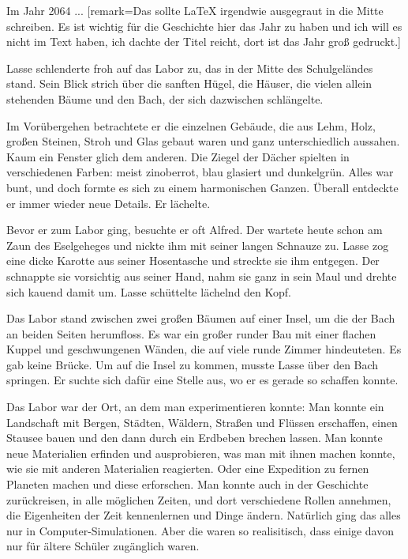 \label{cha:2064_das_labor}

Im Jahr 2064 ... [remark={Das sollte LaTeX irgendwie ausgegraut in die Mitte schreiben. Es ist wichtig für die Geschichte hier das Jahr zu haben und ich will es nicht im Text haben, ich dachte der Titel reicht, dort ist das Jahr groß gedruckt.}]

Lasse schlenderte froh auf das Labor zu, das in der Mitte des Schulgeländes stand. 
Sein Blick strich über die sanften Hügel, die Häuser, die vielen allein stehenden Bäume und den Bach, der sich dazwischen schlängelte.

Im Vorübergehen betrachtete er die einzelnen Gebäude, die aus Lehm, Holz, großen Steinen, Stroh und Glas gebaut waren und ganz unterschiedlich aussahen. Kaum ein Fenster glich dem anderen. Die Ziegel der Dächer spielten in verschiedenen Farben: meist zinoberrot, blau glasiert und dunkelgrün. Alles war bunt, und doch formte es sich zu einem harmonischen Ganzen.
Überall entdeckte er immer wieder neue Details.
Er lächelte.

Bevor er zum Labor ging, besuchte er oft Alfred.
Der wartete heute schon am Zaun des Eselgeheges und nickte ihm mit seiner langen Schnauze zu.
Lasse zog eine dicke Karotte aus seiner Hosentasche und streckte sie ihm entgegen.
Der schnappte sie vorsichtig aus seiner Hand, nahm sie ganz in sein Maul und drehte sich kauend damit um.
Lasse schüttelte lächelnd den Kopf.

Das Labor stand zwischen zwei großen Bäumen auf einer Insel, um die der Bach an beiden Seiten herumfloss.
Es war ein großer runder Bau mit einer flachen Kuppel und geschwungenen Wänden, die auf viele runde Zimmer hindeuteten.
Es gab keine Brücke.
Um auf die Insel zu kommen, musste Lasse über den Bach springen.
Er suchte sich dafür eine Stelle aus, wo er es gerade so schaffen konnte.

Das Labor war der Ort, an dem man experimentieren konnte: Man konnte ein Landschaft mit Bergen, Städten, Wäldern, Straßen und Flüssen erschaffen, einen Stausee bauen und den dann durch ein Erdbeben brechen lassen.
Man konnte neue Materialien erfinden und ausprobieren, was man mit ihnen machen konnte, wie sie mit anderen Materialien reagierten.
Oder eine Expedition zu fernen Planeten machen und diese erforschen.
Man konnte auch in der Geschichte zurückreisen, in alle möglichen Zeiten, und dort verschiedene Rollen annehmen, die Eigenheiten der Zeit kennenlernen und Dinge ändern.
Natürlich ging das alles nur in Computer-Simulationen.
Aber die waren so realisitisch, dass einige davon nur für ältere Schüler zugänglich waren.

